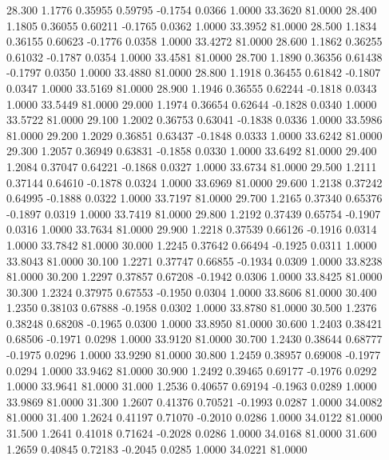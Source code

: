   28.300   1.1776   0.35955   0.59795  -0.1754   0.0366   1.0000  33.3620  81.0000
  28.400   1.1805   0.36055   0.60211  -0.1765   0.0362   1.0000  33.3952  81.0000
  28.500   1.1834   0.36155   0.60623  -0.1776   0.0358   1.0000  33.4272  81.0000
  28.600   1.1862   0.36255   0.61032  -0.1787   0.0354   1.0000  33.4581  81.0000
  28.700   1.1890   0.36356   0.61438  -0.1797   0.0350   1.0000  33.4880  81.0000
  28.800   1.1918   0.36455   0.61842  -0.1807   0.0347   1.0000  33.5169  81.0000
  28.900   1.1946   0.36555   0.62244  -0.1818   0.0343   1.0000  33.5449  81.0000
  29.000   1.1974   0.36654   0.62644  -0.1828   0.0340   1.0000  33.5722  81.0000
  29.100   1.2002   0.36753   0.63041  -0.1838   0.0336   1.0000  33.5986  81.0000
  29.200   1.2029   0.36851   0.63437  -0.1848   0.0333   1.0000  33.6242  81.0000
  29.300   1.2057   0.36949   0.63831  -0.1858   0.0330   1.0000  33.6492  81.0000
  29.400   1.2084   0.37047   0.64221  -0.1868   0.0327   1.0000  33.6734  81.0000
  29.500   1.2111   0.37144   0.64610  -0.1878   0.0324   1.0000  33.6969  81.0000
  29.600   1.2138   0.37242   0.64995  -0.1888   0.0322   1.0000  33.7197  81.0000
  29.700   1.2165   0.37340   0.65376  -0.1897   0.0319   1.0000  33.7419  81.0000
  29.800   1.2192   0.37439   0.65754  -0.1907   0.0316   1.0000  33.7634  81.0000
  29.900   1.2218   0.37539   0.66126  -0.1916   0.0314   1.0000  33.7842  81.0000
  30.000   1.2245   0.37642   0.66494  -0.1925   0.0311   1.0000  33.8043  81.0000
  30.100   1.2271   0.37747   0.66855  -0.1934   0.0309   1.0000  33.8238  81.0000
  30.200   1.2297   0.37857   0.67208  -0.1942   0.0306   1.0000  33.8425  81.0000
  30.300   1.2324   0.37975   0.67553  -0.1950   0.0304   1.0000  33.8606  81.0000
  30.400   1.2350   0.38103   0.67888  -0.1958   0.0302   1.0000  33.8780  81.0000
  30.500   1.2376   0.38248   0.68208  -0.1965   0.0300   1.0000  33.8950  81.0000
  30.600   1.2403   0.38421   0.68506  -0.1971   0.0298   1.0000  33.9120  81.0000
  30.700   1.2430   0.38644   0.68777  -0.1975   0.0296   1.0000  33.9290  81.0000
  30.800   1.2459   0.38957   0.69008  -0.1977   0.0294   1.0000  33.9462  81.0000
  30.900   1.2492   0.39465   0.69177  -0.1976   0.0292   1.0000  33.9641  81.0000
  31.000   1.2536   0.40657   0.69194  -0.1963   0.0289   1.0000  33.9869  81.0000
  31.300   1.2607   0.41376   0.70521  -0.1993   0.0287   1.0000  34.0082  81.0000
  31.400   1.2624   0.41197   0.71070  -0.2010   0.0286   1.0000  34.0122  81.0000
  31.500   1.2641   0.41018   0.71624  -0.2028   0.0286   1.0000  34.0168  81.0000
  31.600   1.2659   0.40845   0.72183  -0.2045   0.0285   1.0000  34.0221  81.0000

